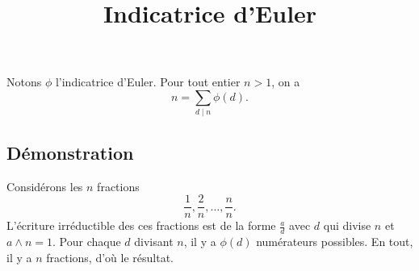 \documentclass[fontsize=12pt,twoside=false,parskip=half, french]{scrartcl}
\title{Indicatrice d’Euler}
\date{}
\author{}
\begin{document}
\maketitle
   \begin{Theoreme}
      Notons $\phi$ l’indicatrice d’Euler. Pour tout entier $n > 1$, on a
      \[
         n = \sum_{d \mid n} \phi(d).
      \]
   \end{Theoreme}
   \subsection{Démonstration}
      Considérons les $n$ fractions
      \[
         \frac{1}{n}, \frac{2}{n}, \ldots, \frac{n}{n}.
      \]
      L’écriture irréductible des ces fractions est de la forme $\frac{a}{d}$ avec $d$ qui divise
      $n$ et $a \wedge n = 1$. Pour chaque $d$ divisant $n$, il y a $\phi(d)$ numérateurs possibles.
      En tout, il y a $n$ fractions, d’où le résultat.
\end{document}
